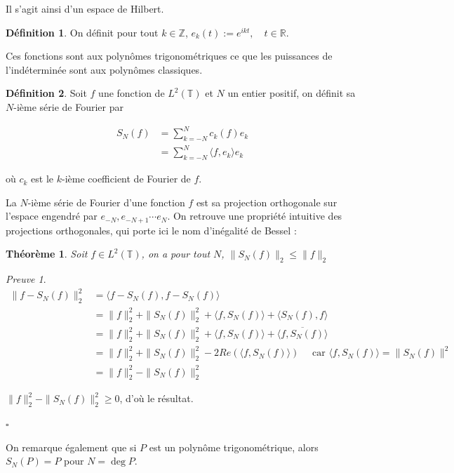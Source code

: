 \documentclass[]{article}
\newtheorem{mythm}{Théorème}
\theoremstyle{remark}
\newtheorem{myproof}{Preuve}
\theoremstyle{definition}
\newtheorem{mydef}{Définition}
\newcommand{\cqfd}{
	\hfill$\square$
}
\begin{document}
		 Il s'agit ainsi d'un espace de Hilbert.
		 
		\begin{mydef}
			On définit pour tout $k \in \mathbb{Z}$,  $e_k(t):=e^{ikt}, \quad t\in \mathbb{R}.$	
		\end{mydef}
		
		Ces fonctions sont aux polynômes trigonométriques ce que les puissances de l'indéterminée sont aux polynômes classiques.
		
		\begin{mydef}
			Soit $f$ une fonction de $L^2(\mathbb{T})$ et $N$ un entier positif, on définit sa $N$-ième série de Fourier par
			
			\begin{align*}
				S_N(f) &= \sum_{k = -N}^N c_k(f) e_k \\
				&= \sum_{k = -N}^N \langle f, e_k \rangle e_k
			\end{align*}
			
			où $c_k$ est le $k$-ième coefficient de Fourier de $f$.
		\end{mydef}

		La $N$-ième série de Fourier d'une fonction $f$ est sa projection orthogonale sur l'espace engendré par $e_{-N}, e_{-N+1} \cdots e_N$. On retrouve une propriété intuitive des projections orthogonales, qui porte ici le nom d'inégalité de Bessel :
		
		\begin{mythm}
			Soit $f \in L^2(\mathbb{T})$, on a pour tout $N$, $\|S_N(f)\|_2 \leqslant \|f\|_2$
		\end{mythm}
		
		\begin{myproof}
			\begin{align*}
				\| f - S_N(f) \|^2_2 &= \langle f - S_N(f), f -S_N(f) \rangle \\
									 & = \| f \|^2_2 + \| S_N(f)\|^2_2 + \langle f, S_N(f) \rangle + \langle S_N(f), f \rangle \\ 
									 & = \| f \|^2_2 + \| S_N(f)\|^2_2 + \langle f, S_N(f) \rangle + \overline {\langle  f, S_N(f)\rangle } \\
									 &= \| f \|^2_2 + \| S_N(f)\|^2_2 - 2Re (\langle f, S_N(f) \rangle) \quad \text{ car } \langle f, S_N(f) \rangle = \| S_N(f)\|^2 \\
									 &=  \| f \|^2_2 - \| S_N(f)\|^2_2
			\end{align*}
			
			$\| f \|^2_2 - \| S_N(f)\|^2_2 \geqslant 0$, d'où le résultat.
			\cqfd
		\end{myproof}
			On remarque également que si $P$ est un polynôme trigonométrique, alors $S_N(P) = P$ pour $N = \deg P$. 
			
\end{document}
